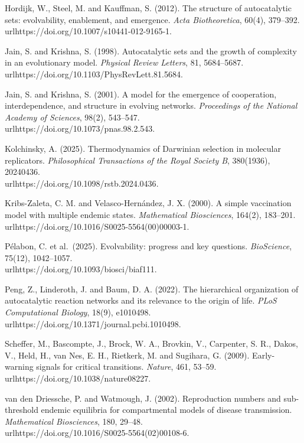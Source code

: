 \documentclass[11pt]{article}
\begin{document}
Hordijk, W., Steel, M. and Kauffman, S. (2012). The structure of
autocatalytic sets: evolvability, enablement, and emergence. \emph{Acta
Biotheoretica}, 60(4), 379--392. \\url{https://doi.org/10.1007/s10441-012-9165-1}.

Jain, S. and Krishna, S. (1998). Autocatalytic sets and the growth of
complexity in an evolutionary model. \emph{Physical Review Letters}, 81,
5684--5687. \\url{https://doi.org/10.1103/PhysRevLett.81.5684}.

Jain, S. and Krishna, S. (2001). A model for the emergence of
cooperation, interdependence, and structure in evolving networks.
\emph{Proceedings of the National Academy of Sciences}, 98(2), 543--547.
\\url{https://doi.org/10.1073/pnas.98.2.543}.

Kolchinsky, A. (2025). Thermodynamics of Darwinian selection in
molecular replicators. \emph{Philosophical Transactions of the Royal
Society B}, 380(1936), 20240436. \\url{https://doi.org/10.1098/rstb.2024.0436}.

Kribs-Zaleta, C. M. and Velasco-Hernández, J. X. (2000). A simple
vaccination model with multiple endemic states. \emph{Mathematical
Biosciences}, 164(2), 183--201. \\url{https://doi.org/10.1016/S0025-5564(00)00003-1}.

Pélabon, C. et al.~(2025). Evolvability: progress and key questions.
\emph{BioScience}, 75(12), 1042--1057. \\url{https://doi.org/10.1093/biosci/biaf111}.

Peng, Z., Linderoth, J. and Baum, D. A. (2022). The hierarchical
organization of autocatalytic reaction networks and its relevance to the
origin of life. \emph{PLoS Computational Biology}, 18(9), e1010498.
\\url{https://doi.org/10.1371/journal.pcbi.1010498}.

Scheffer, M., Bascompte, J., Brock, W. A., Brovkin, V., Carpenter, S.
R., Dakos, V., Held, H., van Nes, E. H., Rietkerk, M. and Sugihara, G.
(2009). Early-warning signals for critical transitions. \emph{Nature},
461, 53--59. \\url{https://doi.org/10.1038/nature08227}.

van den Driessche, P. and Watmough, J. (2002). Reproduction numbers and
sub-threshold endemic equilibria for compartmental models of disease
transmission. \emph{Mathematical Biosciences}, 180, 29--48.
\\url{https://doi.org/10.1016/S0025-5564(02)00108-6}.
\end{document}
